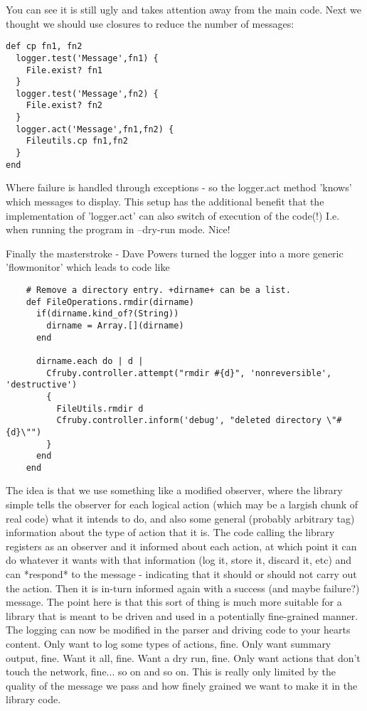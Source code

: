 You can see it is still ugly and takes attention away from the main
code. Next we thought we should use closures to reduce the number
of messages:

\begin{verbatim}
def cp fn1, fn2
  logger.test('Message',fn1) {
    File.exist? fn1
  }
  logger.test('Message',fn2) {
    File.exist? fn2
  }
  logger.act('Message',fn1,fn2) {
    Fileutils.cp fn1,fn2
  }
end
\end{verbatim}

Where failure is handled through exceptions - so the logger.act method
'knows' which messages to display. This setup has the additional
benefit that the implementation of 'logger.act' can also switch of
execution of the code(!) I.e. when running the program in --dry-run
mode. Nice!

Finally the masterstroke - Dave Powers turned the logger into a more
generic 'flowmonitor' which leads to code like

\begin{verbatim}
    # Remove a directory entry. +dirname+ can be a list.
    def FileOperations.rmdir(dirname)
      if(dirname.kind_of?(String))
        dirname = Array.[](dirname)
      end

      dirname.each do | d |
        Cfruby.controller.attempt("rmdir #{d}", 'nonreversible', 'destructive')
        {
          FileUtils.rmdir d
          Cfruby.controller.inform('debug', "deleted directory \"#{d}\"")
        }
      end
    end
\end{verbatim}

The idea is that we use something like a modified observer, where the
library simple tells the observer for each logical action (which may
be a largish chunk of real code) what it intends to do, and also some
general (probably arbitrary tag) information about the type of action
that it is.  The code calling the library registers as an observer and
it informed about each action, at which point it can do whatever it
wants with that information (log it, store it, discard it, etc) and
can *respond* to the message - indicating that it should or should not
carry out the action.  Then it is in-turn informed again with a
success (and maybe failure?) message.  The point here is that this
sort of thing is much more suitable for a library that is meant to be
driven and used in a potentially fine-grained manner.  The logging can
now be modified in the parser and driving code to your hearts content.
Only want to log some types of actions, fine.  Only want summary
output, fine.  Want it all, fine.  Want a dry run, fine.  Only want
actions that don't touch the network, fine... so on and so on.  This
is really only limited by the quality of the message we pass and how
finely grained we want to make it in the library code.

